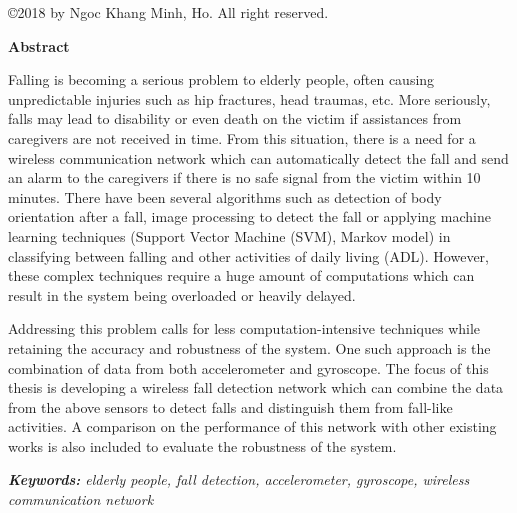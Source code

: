 \cleardoublepage

\pagestyle{plain}
\setcounter{page}{3}

\cleardoublepage %

\begin{center}
\vspace*{\fill}
\copyright 2018 by Ngoc Khang Minh, Ho. All right reserved.
\vspace*{\fill}
\end{center}



\cleardoublepage

\begin{center}\textbf{Abstract}\end{center}
{
	\par
	Falling is becoming a serious problem to elderly people, often causing unpredictable injuries such as hip fractures, head traumas, etc. More seriously, falls may lead to disability or even death on the victim if assistances from caregivers are not received in time. From this situation, there is a need for a wireless communication network which can automatically detect the fall and send an alarm to the caregivers if there is no safe signal from the victim within 10 minutes. There have been several algorithms such as detection of body orientation after a fall, image processing to detect the fall or applying machine learning techniques (Support Vector Machine (SVM), Markov model) in classifying between falling and other activities of daily living (ADL). However, these complex techniques require a huge amount of computations which can result in the system being overloaded or heavily delayed.\par
	Addressing this problem calls for less computation-intensive techniques while retaining the accuracy and robustness of the system. One such approach is the combination of data from both accelerometer and gyroscope. The focus of this thesis is developing a wireless fall detection network which can combine the data from the above sensors to detect falls and distinguish them from fall-like activities. A comparison on the performance of this network with other existing works is also included to evaluate the robustness of the system.\par
	\vspace{1cm}
	\textit{\textbf{Keywords:} elderly people, fall detection, accelerometer, gyroscope,  wireless communication network}
}
\cleardoublepage

